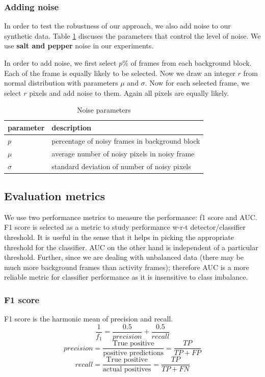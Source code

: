 \subsubsection{Adding noise}
In order to test the robustness of our approach, we also add noise to our synthetic data. Table \ref{table:noise-params} discuses the parameters that control the level of noise. We use \textbf{salt and pepper} noise in our experiments.

In order to add noise, we first select $p\%$ of frames from each background block. Each of the frame is equally likely to be selected. Now we draw an integer $r$ from normal distribution with parameters $\mu$ and $\sigma$. Now for each selected frame, we select $r$ pixels and add noise to them. Again all pixels are equally likely. 

\begin{table}
\centering
\caption{Noise parameters}  \vspace{5pt}
\label{table:noise-params}
\begin{tabular}{|l|l|}
\hline
parameter & description                              \\ \hline \hline
$p$         & percentage of noisy frames in background block  \\ 
$\mu$        & average number of noisy pixels in noisy frame     \\ 
$\sigma$     & standard deviation of number of noisy pixels     \\ \hline
\end{tabular}
\end{table}

\subsection{Evaluation metrics}
We use two performance metrics to measure the performance: f1 score and AUC. F1 score is selected as a metric to study performance w-r-t detector/classifier threshold. It is useful in the sense that it helps in picking the appropriate threshold for the classifier. AUC on the other hand is independent of a particular threshold. Further, since we are dealing with unbalanced data (there may be much more background frames than activity frames); therefore AUC is a more reliable metric for classifier performance as it is insensitive to class imbalance.  
\subsubsection{F1 score}
F1 score is the harmonic mean of precision and recall. 
$$\frac{1}{f_1} = \frac{0.5}{precision} +  \frac{0.5}{recall} $$
$$precision = \frac{\text{True positive}}{\text{positive predictions}} =  \frac{TP}{TP + FP}$$
$$recall = \frac{\text{True positive}}{\text{actual positives}} =  \frac{TP}{TP + FN}$$

